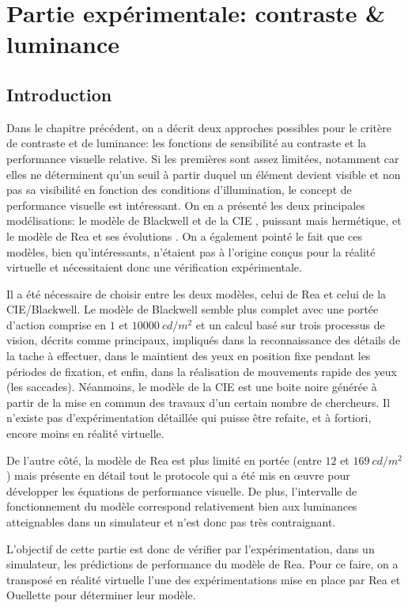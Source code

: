 \part{Partie expérimentale: contraste \& luminance}

\chapter*{Introduction}
\par Dans le chapitre précédent, on a décrit deux approches possibles pour le critère de contraste et de luminance: les fonctions de sensibilité au contraste et la performance visuelle relative. Si les premières sont assez limitées, notamment car elles ne déterminent qu'un seuil à partir duquel un élément devient visible et non pas sa visibilité en fonction des conditions d'illumination, le concept de performance visuelle est intéressant. On en a présenté les deux principales modélisations: le modèle de Blackwell et de la CIE \citep{blackwell_ieri:_1971}, puissant mais hermétique, et le modèle de Rea et ses évolutions \citep{rea_toward_1986}. On a également pointé le fait que ces modèles, bien qu'intéressants, n'étaient pas à l'origine conçus pour la réalité virtuelle et nécessitaient donc une vérification expérimentale.

\par Il a été nécessaire de choisir entre les deux modèles, celui de Rea et celui de la CIE/Blackwell. Le modèle de Blackwell semble plus complet avec une portée d'action comprise en $1$ et $10000~cd/m^2$ et un calcul basé sur trois processus de vision, décrits comme principaux, impliqués dans la reconnaissance des détails de la tache à effectuer, dans le maintient des yeux en position fixe pendant les périodes de fixation, et enfin, dans la réalisation de mouvements rapide des yeux (les saccades). Néanmoins, le modèle de la CIE est une boite noire générée à partir de la mise en commun des travaux d'un certain nombre de chercheurs. Il n'existe pas d'expérimentation détaillée qui puisse être refaite, et à fortiori, encore moins en réalité virtuelle.

\par De l'autre côté, la modèle de Rea est plus limité en portée (entre $12$ et $169~cd/m^2$) mais présente en détail tout le protocole qui a été mis en œuvre pour développer les équations de performance visuelle. De plus, l'intervalle de fonctionnement du modèle correspond relativement bien aux luminances atteignables dans un simulateur et n'est donc pas très contraignant.

\par L'objectif de cette partie est donc de vérifier par l'expérimentation, dans un simulateur, les prédictions de performance du modèle de Rea. Pour ce faire, on a transposé en réalité virtuelle l'une des expérimentations mise en place par Rea et Ouellette pour déterminer leur modèle.